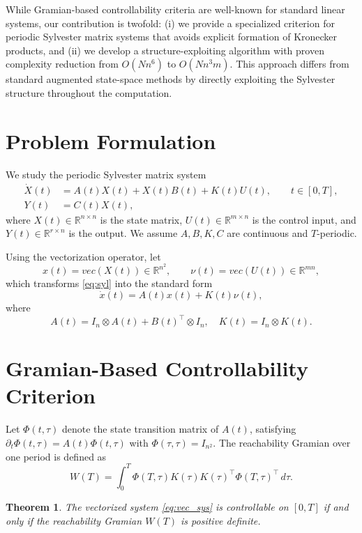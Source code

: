 \documentclass[5p,times]{elsarticle} %
\def\Ktil{K}%
\def\Acal{A}%
\def\vect{vec}%
\newtheorem{theorem}{Theorem}
\newcommand{\vect}{\mathrm{vec}}
\newcommand{\Ktil}{\widetilde{K}}
\newcommand{\Acal}{\mathcal{A}}
\begin{document}
While Gramian-based controllability criteria are well-known for standard linear systems, our contribution is twofold: (i) we provide a specialized criterion for periodic Sylvester matrix systems that avoids explicit formation of Kronecker products, and (ii) we develop a structure-exploiting algorithm with proven complexity reduction from $O(Nn^6)$ to $O(Nn^3m)$. This approach differs from standard augmented state-space methods by directly exploiting the Sylvester structure throughout the computation.

\section{Problem Formulation}
We study the periodic Sylvester matrix system
\begin{align}
\dot X(t) &= A(t)X(t) + X(t)B(t) + K(t)U(t),\qquad t\in[0,T],\label{eq:syl}\\
Y(t) &= C(t)X(t),
\end{align}
where \(X(t)\in\mathbb{R}^{n\times n}\) is the state matrix, \(U(t)\in\mathbb{R}^{m\times n}\) is the control input, and \(Y(t)\in\mathbb{R}^{r\times n}\) is the output. We assume \(A,B,K,C\) are continuous and \(T\)-periodic.

Using the vectorization operator, let
\[
x(t)=\vect(X(t))\in\mathbb{R}^{n^2},\qquad \nu(t)=\vect(U(t))\in\mathbb{R}^{mn},
\]
which transforms \eqref{eq:syl} into the standard form
\begin{equation}\label{eq:vec_sys}
\dot x(t)=\Acal(t)x(t)+\Ktil(t)\nu(t),
\end{equation}
where
\[
\Acal(t)=I_n\otimes A(t)+B(t)^\top\otimes I_n,\quad
\Ktil(t)=I_n\otimes K(t).
\]

\section{Gramian-Based Controllability Criterion}
Let $\Phi(t,\tau)$ denote the state transition matrix of $\Acal(t)$, satisfying
$\partial_t\Phi(t,\tau)=\Acal(t)\Phi(t,\tau)$ with $\Phi(\tau,\tau)=I_{n^2}$.
The reachability Gramian over one period is defined as
\begin{equation}\label{eq:W}
W(T)=\int_0^T \Phi(T,\tau)\Ktil(\tau)\Ktil(\tau)^\top\Phi(T,\tau)^\top\,d\tau.
\end{equation}

\begin{theorem}\label{thm:main}
The vectorized system \eqref{eq:vec_sys} is controllable on \([0,T]\) if and only if the reachability Gramian \(W(T)\) is positive definite.
\end{theorem}
\end{document}
